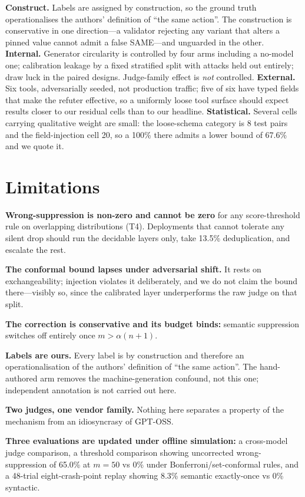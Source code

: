 \documentclass[10pt,twocolumn]{article}
\theoremstyle{definition}
\theoremstyle{remark}
\begin{document}
\textbf{Construct.} Labels are assigned by construction, so the ground truth
operationalises the authors' definition of ``the same action''. The construction
is conservative in one direction---a validator rejecting any variant that alters
a pinned value cannot admit a false SAME---and unguarded in the other.
\textbf{Internal.} Generator circularity is controlled by four arms including a
no-model one; calibration leakage by a fixed stratified split with attacks held
out entirely; draw luck in the paired designs. Judge-family effect is
\emph{not} controlled. \textbf{External.} Six tools, adversarially seeded, not
production traffic; five of six have typed fields that make the refuter
effective, so a uniformly loose tool surface should expect results closer to our
residual cells than to our headline. \textbf{Statistical.} Several cells
carrying qualitative weight are small: the loose-schema category is 8 test pairs
and the field-injection cell 20, so a 100\% there admits a lower bound of 67.6\%
and we quote it.

\section{Limitations}

\textbf{Wrong-suppression is non-zero and cannot be zero} for any score-threshold
rule on overlapping distributions (T4). Deployments that cannot tolerate any
silent drop should run the decidable layers only, take 13.5\% deduplication, and
escalate the rest.

\textbf{The conformal bound lapses under adversarial shift.} It rests on
exchangeability; injection violates it deliberately, and we do not claim the
bound there---visibly so, since the calibrated layer underperforms the raw judge
on that split.

\textbf{The correction is conservative and its budget binds:} semantic
suppression switches off entirely once $m > \alpha(n{+}1)$.

\textbf{Labels are ours.} Every label is by construction and therefore an
operationalisation of the authors' definition of ``the same action''. The
hand-authored arm removes the machine-generation confound, not this one;
independent annotation is not carried out here.

\textbf{Two judges, one vendor family.} Nothing here separates a property of the
mechanism from an idiosyncrasy of GPT-OSS.

\textbf{Three evaluations are updated under offline simulation:} a cross-model
judge comparison, a threshold comparison showing uncorrected wrong-suppression
of 65.0\% at $m=50$ vs 0\% under Bonferroni/set-conformal rules, and a 48-trial
eight-crash-point replay showing 8.3\% semantic exactly-once vs 0\% syntactic.
\end{document}
